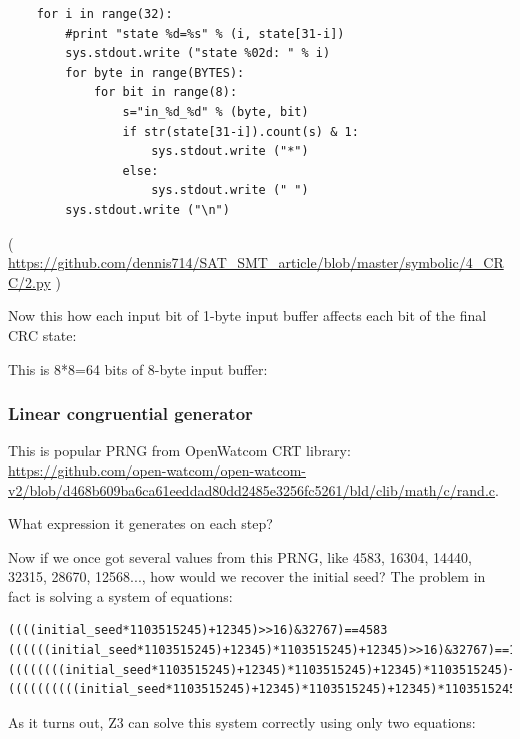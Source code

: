 \begin{lstlisting}
    for i in range(32):
        #print "state %d=%s" % (i, state[31-i])
        sys.stdout.write ("state %02d: " % i)
        for byte in range(BYTES):
            for bit in range(8):
                s="in_%d_%d" % (byte, bit)
                if str(state[31-i]).count(s) & 1:
                    sys.stdout.write ("*")
                else:
                    sys.stdout.write (" ")
        sys.stdout.write ("\n")
\end{lstlisting}

( \url{https://github.com/dennis714/SAT_SMT_article/blob/master/symbolic/4_CRC/2.py} )

Now this how each input bit of 1-byte input buffer affects each bit of the final CRC state:



This is 8*8=64 bits of 8-byte input buffer:



\subsubsection{Linear congruential generator}

This is popular \ac{PRNG} from OpenWatcom \ac{CRT} library: \url{https://github.com/open-watcom/open-watcom-v2/blob/d468b609ba6ca61eeddad80dd2485e3256fc5261/bld/clib/math/c/rand.c}.

What expression it generates on each step?





Now if we once got several values from this PRNG, like 4583, 16304, 14440, 32315, 28670, 12568..., how would we
recover the initial seed?
The problem in fact is solving a system of equations:

\begin{lstlisting}
((((initial_seed*1103515245)+12345)>>16)&32767)==4583
((((((initial_seed*1103515245)+12345)*1103515245)+12345)>>16)&32767)==16304
((((((((initial_seed*1103515245)+12345)*1103515245)+12345)*1103515245)+12345)>>16)&32767)==14440
((((((((((initial_seed*1103515245)+12345)*1103515245)+12345)*1103515245)+12345)*1103515245)+12345)>>16)&32767)==32315
\end{lstlisting}

As it turns out, Z3 can solve this system correctly using only two equations:

